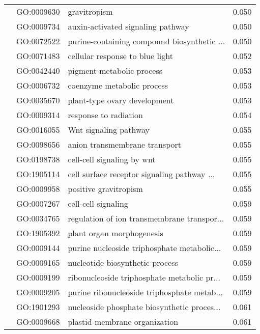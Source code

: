\begin{longtable}{lllr}
   & GO:0009630 &                                 gravitropism &         0.050 \\
   & GO:0009734 &            auxin-activated signaling pathway &         0.050 \\
   & GO:0072522 &  purine-containing compound biosynthetic ... &         0.050 \\
   & GO:0071483 &              cellular response to blue light &         0.052 \\
   & GO:0042440 &                    pigment metabolic process &         0.053 \\
   & GO:0006732 &                   coenzyme metabolic process &         0.053 \\
   & GO:0035670 &                 plant-type ovary development &         0.053 \\
   & GO:0009314 &                        response to radiation &         0.054 \\
   & GO:0016055 &                        Wnt signaling pathway &         0.055 \\
   & GO:0098656 &                anion transmembrane transport &         0.055 \\
   & GO:0198738 &                   cell-cell signaling by wnt &         0.055 \\
   & GO:1905114 &  cell surface receptor signaling pathway ... &         0.055 \\
   & GO:0009958 &                        positive gravitropism &         0.055 \\
   & GO:0007267 &                          cell-cell signaling &         0.059 \\
   & GO:0034765 &  regulation of ion transmembrane transpor... &         0.059 \\
   & GO:1905392 &                    plant organ morphogenesis &         0.059 \\
   & GO:0009144 &  purine nucleoside triphosphate metabolic... &         0.059 \\
   & GO:0009165 &              nucleotide biosynthetic process &         0.059 \\
   & GO:0009199 &  ribonucleoside triphosphate metabolic pr... &         0.059 \\
   & GO:0009205 &  purine ribonucleoside triphosphate metab... &         0.059 \\
   & GO:1901293 &  nucleoside phosphate biosynthetic proces... &         0.061 \\
   & GO:0009668 &                plastid membrane organization &         0.061 \\

\end{longtable}
